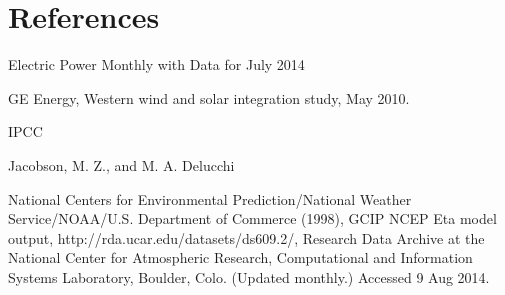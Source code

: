 \section{References}

Electric Power Monthly with Data for July 2014

GE Energy, Western wind and solar integration study, May 2010.

IPCC

Jacobson, M. Z., and M. A. Delucchi

National Centers for Environmental Prediction/National Weather Service/NOAA/U.S. Department of Commerce (1998), GCIP NCEP Eta model output, http://rda.ucar.edu/datasets/ds609.2/, Research Data Archive at the National Center for Atmospheric Research, Computational and Information Systems Laboratory, Boulder, Colo. (Updated monthly.) Accessed 9 Aug 2014.